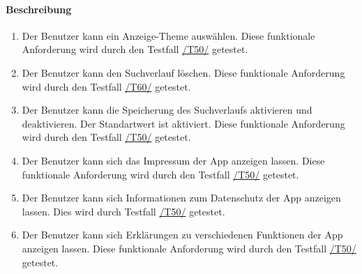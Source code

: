 \paragraph{Beschreibung}
\begin{enumerate}[start=51, label=\textbf{/FA\arabic*/}, align=left]
    \item \label{/FA52/} Der \Gls{Benutzer} kann ein Anzeige-\Gls{Theme} auswählen. Diese funktionale Anforderung wird durch den Testfall \hyperref[/T50/]{/T50/} getestet.
    \item \label{/FA53/} Der \Gls{Benutzer} kann den \Gls{Suchverlauf} löschen. Diese funktionale Anforderung wird durch den Testfall \hyperref[/T60/]{/T60/} getestet.
    \item \label{/FA54/} Der \Gls{Benutzer} kann die Speicherung des \Gls{Suchverlauf}s aktivieren und deaktivieren. Der Standartwert ist \dq aktiviert\dq{}. Diese funktionale Anforderung wird durch den Testfall \hyperref[/T50/]{/T50/} getestet.
    \item \label{/FA55/} Der \Gls{Benutzer} kann sich das Impressum der App anzeigen lassen. Diese funktionale Anforderung wird durch den Testfall \hyperref[/T50/]{/T50/} getestet.
    \item \label{/FA56/} Der \Gls{Benutzer} kann sich Informationen zum Datenschutz der App anzeigen lassen. Dies wird durch Testfall \hyperref[/T50/]{/T50/} getestet.
    \item \label{/FA57/} Der \Gls{Benutzer} kann sich Erklärungen zu verschiedenen Funktionen der App anzeigen lassen. Diese funktionale Anforderung wird durch den Testfall \hyperref[/T50/]{/T50/} getestet.
\end{enumerate}